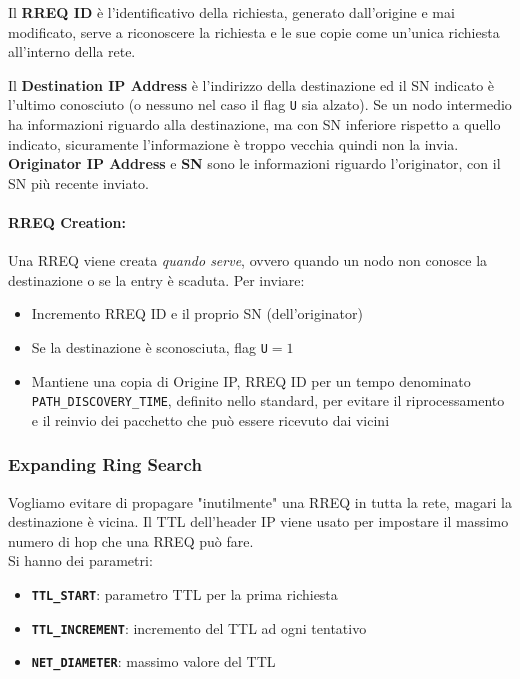 Il \textbf{RREQ ID} è l'identificativo della richiesta, generato dall'origine e mai modificato, serve a riconoscere la richiesta e le sue copie come un'unica richiesta all'interno della rete.\\

\newpage

Il \textbf{Destination IP Address} è l'indirizzo della destinazione ed il SN indicato è l'ultimo conosciuto (o nessuno nel caso il flag \texttt{U} sia alzato). Se un nodo intermedio ha informazioni riguardo alla destinazione, ma con SN inferiore rispetto a quello indicato, sicuramente l'informazione è troppo vecchia quindi non la invia.\\

\textbf{Originator IP Address} e \textbf{SN} sono le informazioni riguardo l'originator, con il SN più recente inviato.\\

\paragraph{RREQ Creation:} Una RREQ viene creata \textit{quando serve}, ovvero quando un nodo non conosce la destinazione o se la entry è scaduta. Per inviare:
\begin{itemize}
	\item Incremento RREQ ID e il proprio SN (dell'originator)
	\item Se la destinazione è sconosciuta, flag \texttt{U}$=1$
	\item Mantiene una copia di Origine IP, RREQ ID per un tempo denominato \texttt{PATH\_DISCOVERY\_TIME}, definito nello standard, per evitare il riprocessamento e il reinvio dei pacchetto che può essere ricevuto dai vicini
\end{itemize}

\subsubsection{Expanding Ring Search}

 Vogliamo evitare di propagare "inutilmente" una RREQ in tutta la rete, magari la destinazione è vicina. Il TTL dell'header IP viene usato per impostare il massimo numero di hop che una RREQ può fare.\\

Si hanno dei parametri:
\begin{itemize}
	\item \textbf{\texttt{TTL\_START}}: parametro TTL per la prima richiesta
	\item \textbf{\texttt{TTL\_INCREMENT}}: incremento del TTL ad ogni tentativo
	\item \texttt{\textbf{NET\_DIAMETER}}: massimo valore del TTL
\end{itemize}

